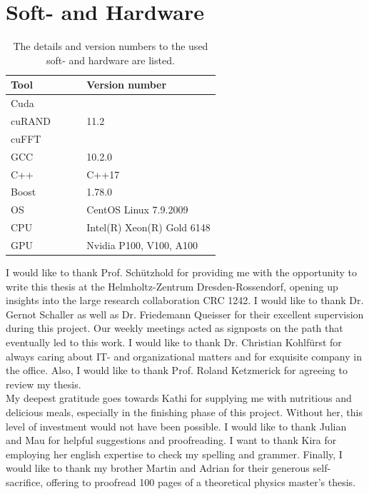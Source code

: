 	\section{Soft- and Hardware}
	\begin{table}[h]
		\centering
		\caption{The details and version numbers to the used soft- and hardware are listed.}
		\renewcommand{\arraystretch}{1.7}
		\begin{tabular}{l l }
			\toprule
			Tool $\qquad \qquad $& Version number \\
			\midrule
			Cuda &  $~$\\
			cuRAND & 11.2 \\
			cuFFT & $~$\\
			\midrule
			GCC & 10.2.0 \\
			C++ & C++17 \\
			Boost & 1.78.0 \\					
			\midrule
			OS & CentOS Linux 7.9.2009 \\
			CPU & Intel(R) Xeon(R) Gold 6148 \\
			GPU & Nvidia P100, V100, A100 \\
			\bottomrule
		\end{tabular}
		\label{Table::Hardware-Software}
	\end{table}

	
	
	
	\clearpage
	\pagestyle{empty}
	I would like to thank Prof. Schützhold for providing me with the opportunity to write this thesis at the Helmholtz-Zentrum Dresden-Rossendorf, opening up insights into the large research collaboration CRC 1242. I would like to thank Dr. Gernot Schaller as well as Dr. Friedemann Queisser for their excellent supervision during this project. Our weekly meetings acted as signposts on the path that eventually led to this work. I would like to thank Dr. Christian Kohlfürst for always caring about IT- and organizational matters and for exquisite company in the office. Also, I would like to thank Prof. Roland Ketzmerick for agreeing to review my thesis. \\
	
	My deepest gratitude goes towards Kathi for supplying me with nutritious and delicious meals, especially in the finishing phase of this project. Without her, this level of investment would not have been possible.  I would like to thank Julian and Mau for helpful suggestions and proofreading. I want to thank Kira for employing her english expertise to check my spelling and grammer. Finally, I would like to thank my brother Martin and Adrian for their generous self-sacrifice, offering to proofread 100 pages of a theoretical physics master's thesis.
	
